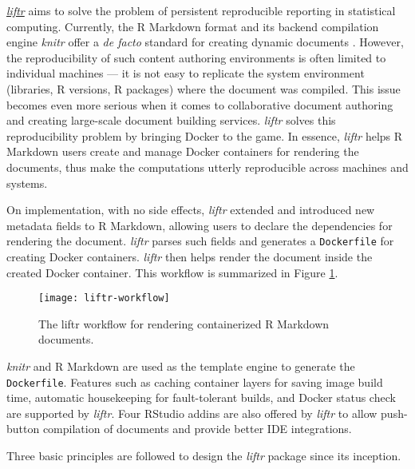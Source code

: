 \href{https://nanx.me/liftr/}{\emph{liftr}} \citep{liftr2019} aims to
solve the problem of persistent reproducible reporting in statistical
computing. Currently, the R Markdown format and its backend compilation
engine \emph{knitr} offer a \emph{de facto} standard for creating
dynamic documents \citep{xie2018}. However, the reproducibility of such
content authoring environments is often limited to individual machines
--- it is not easy to replicate the system environment (libraries, R
versions, R packages) where the document was compiled. This issue
becomes even more serious when it comes to collaborative document
authoring and creating large-scale document building services.
\emph{liftr} solves this reproducibility problem by bringing Docker to
the game. In essence, \emph{liftr} helps R Markdown users create and
manage Docker containers for rendering the documents, thus make the
computations utterly reproducible across machines and systems.

On implementation, with no side effects, \emph{liftr} extended and
introduced new metadata fields to R Markdown, allowing users to declare
the dependencies for rendering the document. \emph{liftr} parses such
fields and generates a \texttt{Dockerfile} for creating Docker
containers. \emph{liftr} then helps render the document inside the
created Docker container. This workflow is summarized in Figure
\ref{figure:liftr}.

\begin{figure}[htbp]
  \centering
  \texttt{[image: liftr-workflow]}
  \caption{The liftr workflow for rendering containerized R Markdown documents.}
  \label{figure:liftr}
\end{figure}

\emph{knitr} and R Markdown are used as the template engine to generate
the \texttt{Dockerfile}. Features such as caching container layers for
saving image build time, automatic housekeeping for fault-tolerant
builds, and Docker status check are supported by \emph{liftr}. Four
RStudio addins are also offered by \emph{liftr} to allow push-button
compilation of documents and provide better IDE integrations.

Three basic principles are followed to design the \emph{liftr} package
since its inception.

